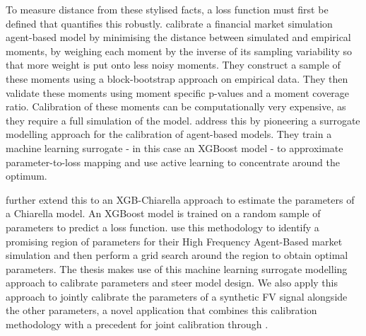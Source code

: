 To measure distance from these stylised facts, a loss function must first be defined that quantifies this robustly. \cite{franke_westerhoff_2012} calibrate a financial market simulation agent-based model by minimising the distance between simulated and empirical moments, by weighing each moment by the inverse of its sampling variability so that more weight is put onto less noisy moments. They construct a sample of these moments using a block-bootstrap approach on empirical data. They then validate these moments using moment specific p-values and a moment coverage ratio. Calibration of these moments can be computationally very expensive, as they require a full simulation of the model. \cite{lamperti_2018} address this by pioneering a surrogate modelling approach for the calibration of agent-based models. They train a machine learning surrogate - in this case an XGBoost model - to approximate parameter-to-loss mapping and use active learning to concentrate around the optimum. 

\cite{gao_2022_xgb} further extend this to an XGB-Chiarella approach to estimate the parameters of a Chiarella model. An XGBoost model is trained on a random sample of parameters to predict a loss function. \cite{gao_2022_hfabm} use this methodology to identify a promising region of parameters for their High Frequency Agent-Based market simulation and then perform a grid search around the region to obtain optimal parameters. The thesis makes use of this machine learning surrogate modelling approach to calibrate parameters and steer model design. We also apply this approach to jointly calibrate the parameters of a synthetic FV signal alongside the other parameters, a novel application that combines this calibration methodology with a precedent for joint calibration through \cite{majewski_2018}.